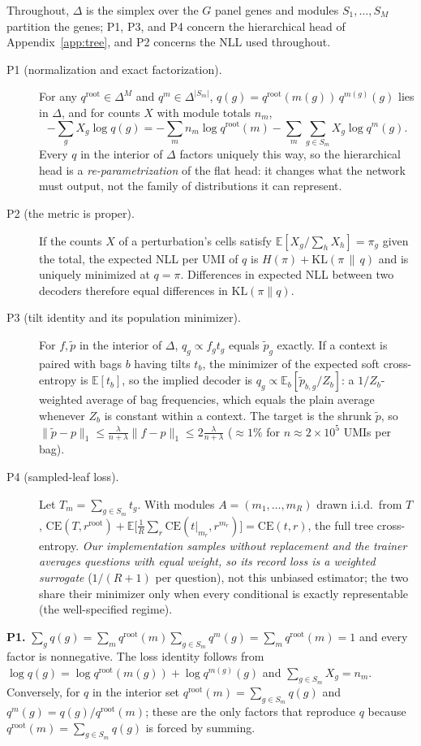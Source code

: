 Throughout, $\Delta$ is the simplex over the $G$ panel genes and modules $S_1,\dots,S_M$ partition the genes; P1, P3, and P4 concern the hierarchical head of Appendix~\ref{app:tree}, and P2 concerns the NLL used throughout.
\begin{description}
\item[P1 (normalization and exact factorization).] For any $q^{\mathrm{root}}\in\Delta^{M}$ and $q^{m}\in\Delta^{|S_m|}$, $q(g)=q^{\mathrm{root}}(m(g))\,q^{m(g)}(g)$ lies in $\Delta$, and for counts $X$ with module totals $n_m$,
\[-\sum_gX_g\log q(g)=-\sum_mn_m\log q^{\mathrm{root}}(m)-\sum_m\sum_{g\in S_m}X_g\log q^m(g).\]
Every $q$ in the interior of $\Delta$ factors uniquely this way, so the hierarchical head is a \emph{re-parametrization} of the flat head: it changes what the network must output, not the family of distributions it can represent.
\item[P2 (the metric is proper).] If the counts $X$ of a perturbation's cells satisfy $\mathbb{E}[X_g/\sum_hX_h]=\pi_g$ given the total, the expected NLL per UMI of $q$ is $H(\pi)+\mathrm{KL}(\pi\,\|\,q)$ and is uniquely minimized at $q=\pi$. Differences in expected NLL between two decoders therefore equal differences in $\mathrm{KL}(\pi\|q)$.
\item[P3 (tilt identity and its population minimizer).] For $f,\tilde p$ in the interior of $\Delta$, $q_g\propto f_gt_g$ equals $\tilde p_g$ exactly. If a context is paired with bags $b$ having tilts $t_b$, the minimizer of the expected soft cross-entropy is $\mathbb{E}[t_b]$, so the implied decoder is $q_g\propto\mathbb{E}_b[\tilde p_{b,g}/Z_b]$: a $1/Z_b$-weighted average of bag frequencies, which equals the plain average whenever $Z_b$ is constant within a context. The target is the shrunk $\tilde p$, so $\lVert\tilde p-p\rVert_1\le\tfrac{\lambda}{n+\lambda}\lVert f-p\rVert_1\le2\tfrac{\lambda}{n+\lambda}$ ($\approx1\%$ for $n\approx2\!\times\!10^5$ UMIs per bag).
\item[P4 (sampled-leaf loss).] Let $T_m=\sum_{g\in S_m}t_g$. With modules $A=(m_1,\dots,m_R)$ drawn i.i.d.\ from $T$, $\mathrm{CE}(T,r^{\mathrm{root}})+\mathbb{E}\big[\tfrac1R\sum_{r}\mathrm{CE}(t|_{m_r},r^{m_r})\big]=\mathrm{CE}(t,r)$, the full tree cross-entropy. \emph{Our implementation samples without replacement and the trainer averages questions with equal weight, so its record loss is a weighted surrogate} ($1/(R{+}1)$ per question), not this unbiased estimator; the two share their minimizer only when every conditional is exactly representable (the well-specified regime).
\end{description}
\textbf{P1.} $\sum_gq(g)=\sum_mq^{\mathrm{root}}(m)\sum_{g\in S_m}q^m(g)=\sum_mq^{\mathrm{root}}(m)=1$ and every factor is nonnegative. The loss identity follows from $\log q(g)=\log q^{\mathrm{root}}(m(g))+\log q^{m(g)}(g)$ and $\sum_{g\in S_m}X_g=n_m$. Conversely, for $q$ in the interior set $q^{\mathrm{root}}(m)=\sum_{g\in S_m}q(g)$ and $q^m(g)=q(g)/q^{\mathrm{root}}(m)$; these are the only factors that reproduce $q$ because $q^{\mathrm{root}}(m)=\sum_{g\in S_m}q(g)$ is forced by summing.

